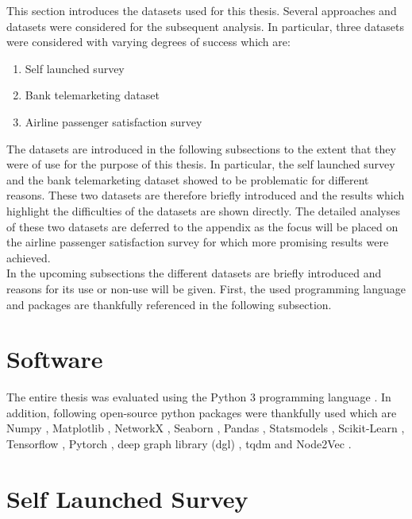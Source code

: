   
  This section introduces the datasets used for this thesis. Several approaches
  and datasets were considered for the subsequent analysis. In particular, three
  datasets were considered with varying degrees of success which are:

  \begin{enumerate}
    \item Self launched survey
    \item Bank telemarketing dataset
    \item Airline passenger satisfaction survey
  \end{enumerate}

  \noindent The datasets are introduced in the following subsections to the
  extent that they were of use for the purpose of this thesis. In particular,
  the self launched survey and the bank telemarketing dataset showed to be
  problematic for different reasons. These two datasets are therefore briefly
  introduced and the results which highlight the difficulties of the datasets
  are shown directly. The detailed analyses of these two datasets are deferred
  to the appendix as the focus will be placed on the airline passenger
  satisfaction survey for which more promising results were achieved. \\ 

  \noindent In the upcoming subsections the different datasets are briefly 
  introduced and reasons for its use or non-use will be given. First, the used
  programming language and packages are thankfully referenced in the following
  subsection.

  \section{Software}

  The entire thesis was evaluated using the Python 3 programming
  language \citep{vanRossum2009}. In addition, following open-source python
  packages were thankfully used which are Numpy \citep{harris2020array},
  Matplotlib \citep{Hunter2007}, NetworkX \citep{hagberg2008exploring}, Seaborn
  \citep{Waskom2021}, Pandas \citep{mckinney2010data}, Statsmodels
  \citep{seabold2010statsmodels}, Scikit-Learn \citep{pedregosa2011scikit},
  Tensorflow \citep{abadi2016tensorflow}, Pytorch \citep{paszke2019pytorch},
  deep graph library (dgl) \citep{wang2019deep}, tqdm \citep{da2021tqdm} and
  Node2Vec \citep{Cohen2021}. 

  \section{Self Launched Survey}
  \label{section:self_survey} 

